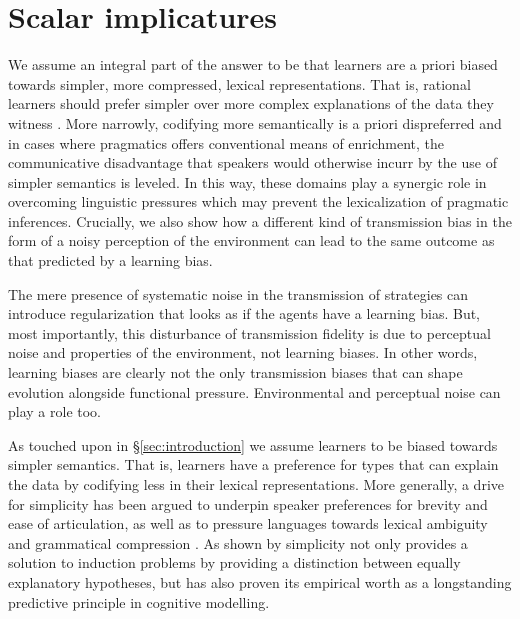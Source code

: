 \documentclass[a4paper]{article}
\newcommand{\hl}[1]{\textcolor[rgb]{.8,.33,.0}{#1}}%
\begin{document}
\section{Scalar implicatures}\label{sec:si-case-study}
%
\hl{We assume an integral part of the answer to be that learners are a priori biased towards simpler, more compressed, lexical representations. That is, rational learners should prefer simpler over more complex explanations of the data they witness \citep{feldman:2000, chater+vitanyi:2003, piantadosi+etal:2012a, kirby+etal:2015,piantadosi+etal:underreview}. More narrowly, codifying more semantically is a priori dispreferred and in cases where pragmatics offers conventional means of enrichment, the communicative disadvantage that speakers would otherwise incurr by the use of simpler semantics is leveled. In this way, these domains play a synergic role in overcoming linguistic pressures which may prevent the lexicalization of pragmatic inferences. Crucially, we also show how a different kind of transmission bias in the form of a noisy perception of the environment can lead to the same outcome as that predicted by a learning bias.}

\hl{The mere presence of systematic noise in the transmission of strategies can introduce regularization that looks as if the agents have a learning bias. But, most importantly, this disturbance of transmission fidelity is due to perceptual noise and properties of the environment, not learning biases. In other words, learning biases are clearly not the only transmission biases that can shape evolution alongside functional pressure. Environmental and perceptual noise can play a role too.}

\hl{As touched upon in \S\ref{sec:introduction} we assume learners to be biased towards simpler semantics. That is, learners have a preference for types that can explain the data by codifying less in their lexical representations. More generally, a drive for simplicity has been argued to underpin speaker preferences for brevity and ease of articulation, as well as to pressure languages towards lexical ambiguity and grammatical compression \citep{zipf:1949,grice:1975,piantadosi+etal:2012b, kirby+etal:2015}. As shown by \citet{chater+vitanyi:2003} simplicity not only provides a solution to induction problems by providing a distinction between equally explanatory hypotheses, but has also proven its empirical worth as a longstanding predictive principle in cognitive modelling.}
\end{document}
